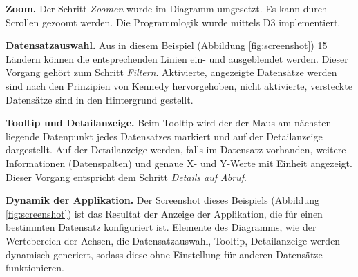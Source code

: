 \textbf{Zoom.} Der Schritt \textit{Zoomen} wurde im Diagramm umgesetzt. Es kann durch Scrollen gezoomt werden. Die Programmlogik wurde mittels D3 implementiert.

\textbf{Datensatzauswahl.} Aus in diesem Beispiel (Abbildung \ref{fig:screenshot}) 15 Ländern können die entsprechenden Linien ein- und ausgeblendet werden. Dieser Vorgang gehört zum Schritt \textit{Filtern}. Aktivierte, angezeigte Datensätze werden sind nach den Prinzipien von Kennedy hervorgehoben, nicht aktivierte, versteckte Datensätze sind in den Hintergrund gestellt.

\textbf{Tooltip und Detailanzeige.} Beim Tooltip wird der der Maus am nächsten liegende Datenpunkt jedes Datensatzes markiert und auf der Detailanzeige dargestellt. Auf der Detailanzeige werden, falls im Datensatz vorhanden, weitere Informationen (Datenspalten) und genaue X- und Y-Werte mit Einheit angezeigt. Dieser Vorgang entspricht dem Schritt \textit{Details auf Abruf}.

\textbf{Dynamik der Applikation.} Der Screenshot dieses Beispiels (Abbildung \ref{fig:screenshot}) ist das Resultat der Anzeige der Applikation, die für einen bestimmten Datensatz konfiguriert ist. Elemente des Diagramms, wie der Wertebereich der Achsen, die Datensatzauswahl, Tooltip, Detailanzeige werden dynamisch generiert, sodass diese ohne Einstellung für anderen Datensätze funktionieren.